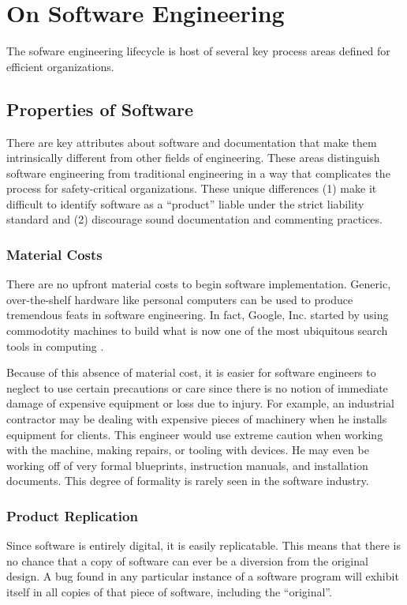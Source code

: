 \section{On Software Engineering}
\label{sdp}
The sofware engineering lifecycle is host of several key process areas defined
for efficient organizations.

\subsection{Properties of Software}\label{software_props}
There are key attributes about software and documentation that make them 
intrinsically different from other fields of engineering. These areas 
distinguish software engineering from traditional engineering in a way that 
complicates the process for safety-critical organizations. These unique
differences (1) make it difficult to identify software as a ``product'' liable
under the strict liability standard and (2) discourage sound documentation and
commenting practices.

\subsubsection*{Material Costs}

There are no upfront material costs to begin software implementation. Generic,
over-the-shelf hardware like personal computers can be used to produce
tremendous feats in software engineering. In fact, Google, Inc. started by using
commodotity machines to build what is now one of the most ubiquitous search 
tools in computing \cite{Google}.

Because of this absence of material cost, it is easier for software engineers to
neglect to use certain precautions or care since there is no notion of immediate
damage of expensive equipment or loss due to injury. For example, an industrial
contractor may be dealing with expensive pieces of machinery when he installs
equipment for clients. This engineer would use extreme caution when working with
the machine, making repairs, or tooling with devices. He may even be working off
of very formal blueprints, instruction manuals, and installation documents. This
degree of formality is rarely seen in the software industry.

\subsubsection*{Product Replication}\label{software_product}
Since software is entirely digital, it is easily replicatable. This means that
there is no chance that a copy of software can ever be a diversion from the
original design. A bug found in any particular instance of a software program
will exhibit itself in all copies of that piece of software, including the
``original''.


